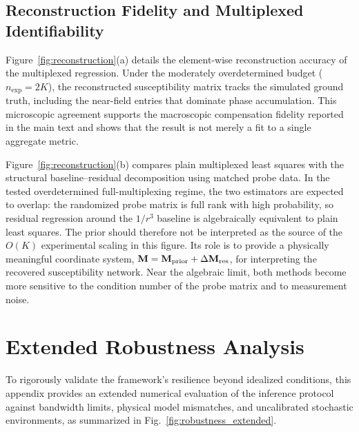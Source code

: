 \documentclass[a4paper,twocolumn,11pt]{quantumarticle}
\begin{document}
\subsection{Reconstruction Fidelity and Multiplexed Identifiability}
\label{app:reconstruction_details}

Figure~\ref{fig:reconstruction}(a) details the element-wise reconstruction accuracy of the multiplexed regression. Under the moderately overdetermined budget ($n_{\text{exp}}=2K$), the reconstructed susceptibility matrix tracks the simulated ground truth, including the near-field entries that dominate phase accumulation. This microscopic agreement supports the macroscopic compensation fidelity reported in the main text and shows that the result is not merely a fit to a single aggregate metric.

Figure~\ref{fig:reconstruction}(b) compares plain multiplexed least squares with the structural baseline--residual decomposition using matched probe data. In the tested overdetermined full-multiplexing regime, the two estimators are expected to overlap: the randomized probe matrix is full rank with high probability, so residual regression around the $1/r^3$ baseline is algebraically equivalent to plain least squares. The prior should therefore not be interpreted as the source of the $O(K)$ experimental scaling in this figure. Its role is to provide a physically meaningful coordinate system, $\mathbf{M}=\mathbf M_{\rm prior}+\Delta\mathbf M_{\rm res}$, for interpreting the recovered susceptibility network. Near the algebraic limit, both methods become more sensitive to the condition number of the probe matrix and to measurement noise.

\section{Extended Robustness Analysis}
\label{app:robustness}

To rigorously validate the framework's resilience beyond idealized conditions, this appendix provides an extended numerical evaluation of the inference protocol against bandwidth limits, physical model mismatches, and uncalibrated stochastic environments, as summarized in Fig.~\ref{fig:robustness_extended}.
\end{document}
